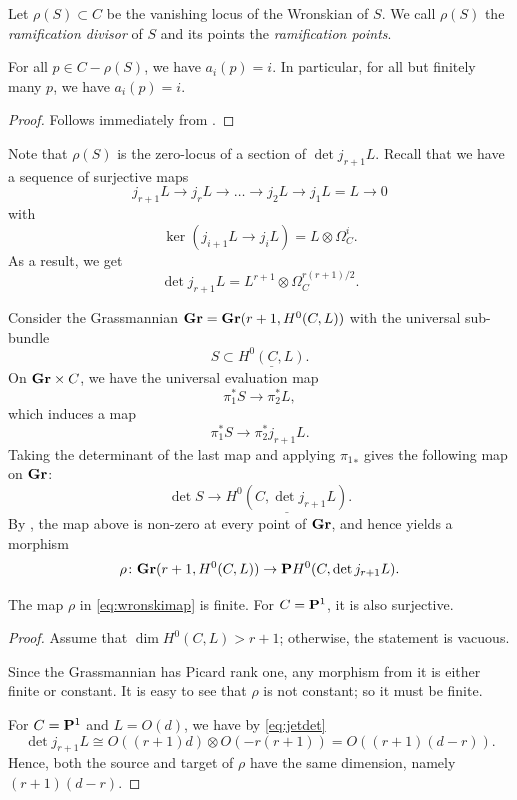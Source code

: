 \documentclass[11pt]{amsart}
\renewcommand {\P}{{\bf P}}
\providecommand {\Gr}{{\bf Gr}}
\begin{document}
Let \(\rho(S) \subset C\) be the vanishing locus of the Wronskian of \(S\).
We call \(\rho(S)\) the \emph{ramification divisor} of \(S\) and its points the \emph{ramification points}.
\begin{corollary}
  For all \(p \in C - \rho(S)\), we have \(a_i(p) = i\).
  In particular, for all but finitely many \(p\), we have \(a_i(p) = i\).
\end{corollary}
\begin{proof}
  Follows immediately from .
\end{proof}

Note that \(\rho(S)\) is the zero-locus of a section of \(\det j_{r+1} L\).
Recall that we have a sequence of surjective maps
\[ j_{r+1}L \to j_{r}L \to \dots \to j_2 L \to j_1 L = L \to 0\]
with
\[ \ker (j_{i+1}L \to j_iL) = L \otimes \Omega_C^{i}.\]
As a result, we get
\begin{equation}\label{eq:jetdet}
  \det j_{r+1} L  = L^{r+1} \otimes \Omega_C^{r(r+1)/2}.
\end{equation}

Consider the Grassmannian \(\Gr = \Gr(r+1, H^0(C,L))\) with the universal sub-bundle
\[ S \subset \underline{H^0(C,L)}.\]
On \(\Gr \times C\), we have the universal evaluation map
\[ \pi_1^* S \to \pi_2^* L,\]
which induces a map
\[ \pi_1^* S \to \pi_2^* j_{r+1} L.\]
Taking the determinant of the last map and applying \({\pi_1}_*\) gives the following map on \(\Gr\):
\[ \det S \to \underline {H^0(C, \det j_{r+1} L)}.\]
By , the map above is non-zero at every point of \(\Gr\), and hence yields a morphism
\begin{equation}\label{eq:wronskimap}
  \rho \colon \Gr(r+1, H^0(C, L)) \to \P H^0(C, \det j_{r+1}L).
\end{equation}
\begin{proposition}\label{prop:wronskimap}
  The map \(\rho\) in \eqref{eq:wronskimap} is finite.
  For \(C = \P^1\), it is also surjective.
\end{proposition}
\begin{proof}
  Assume that \(\dim H^0(C, L) > r+1\); otherwise, the statement is vacuous.
  
  Since the Grassmannian has Picard rank one, any morphism from it is either finite or constant.
  It is easy to see that \(\rho\) is not constant; so it must be finite.

  For \(C = \P^1\) and \(L = O(d)\), we have by \eqref{eq:jetdet}
  \[ \det j_{r+1} L \cong O((r+1)d) \otimes O(-r(r+1)) = O((r+1)(d-r)).\]
  Hence, both the source and target of \(\rho\) have the same dimension, namely \((r+1)(d-r)\).
\end{proof}
  
\end{document}
